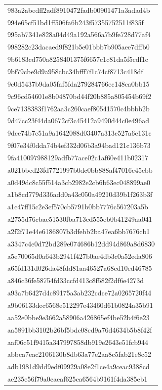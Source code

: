 \begin{tabular}{l}
983a2abedff2adf8910472fadb00901471a3adad4b \\
994e65cf51bd1ff506fa6b243f57355752511f835f \\
995ab7341e828a04d49a192a566a7b9fe728d77af4 \\
998282c23dacaed9f821b5e01bbb7b905aee7dffb0 \\
9b6183cd750a8258401375f6657c1c81da5f5cdf1c \\
9bf79cbe9d9a958cbc34bfff7f1c74cf8713c418df \\
9c0d5437b9da05faf5fda279284766ec148ca0bb15 \\
9c96cd54601e8b04870bd44f20b885a805454b69f2 \\
9ce7138383f1762aa3c260caef80541570c4bbbb2b \\
9d47cc23f44da0672cf3c45412a9490d44c0e496ad \\
9dce74b7c51a9a1642088d03407a313c527a6c131c \\
9f07e34f0dda74b4ef332d06b3a94bad121c136b73 \\
9fa410097988129adfb77ace02c1af60e411b02317 \\
a021bbcd23fd7721997b0dc0bb888af47016c45ebb \\
a0d49dc8c55f514a3cb2982e2cb6b63ec048899ae0 \\
a1b8cd779d336add0a43c050a49210d39b1f263b3f \\
a1c47ff15c2e3cf570cb5791b0bb7776c567203a5b \\
a2755d76cbac51530fba713ed555eb0b41249aa041 \\
a2f2f71e44e6186807b3dfebb2ba47ea6bb7676cb1 \\
a3347c4e0d72bd289e074686b12dd94d869a8d6830 \\
a5e70065d0a643b2941f427b0ae4db3c0a52eda806 \\
a65fd131d026da48fdd81aa46527a68ed10ed46785 \\
a846c36fe58754fd33ccfd413c8f582f2df6e4273d \\
a93a7b6427d4c89175a3ab232cdce72a0265720f44 \\
a9b06133dec6568e512297e43460d61b0824a35b91 \\
aa52e0bbe9e3662a58906a426865ef4be52b4f6e23 \\
aa5891bb3102b26bf5bdc08cd9a76d4634b5b8f42f \\
aaf06c51f9415a347997858db919e2643e51fcb944 \\
abbca7eac2106130b8db63a77e2aa8c5fab21e8c52 \\
adb1981d9dd9edf09929a08e2f1ce4a9ceac9388cd \\
ae235e56f79a0caeaf625ca6564b9161f4da385eb1 \\

\end{tabular}
